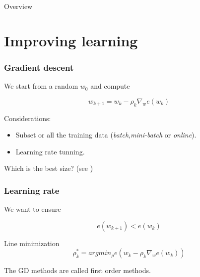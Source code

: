 


\begin{frame}{Overview}
  \tableofcontents
\end{frame}
\section{Improving learning}

\begin{frame}
  \frametitle{Gradient descent}

  We start from a random $w_0$ and compute 

  \begin{equation}
    w_{k +1} 
    = 
    w_{k} - \rho_k \nabla_w e(w_k)
  \end{equation}
  
  Considerations: 
  \begin{itemize}
    \item Subset or all the training data (\textit{batch},\textit{mini-batch} or \textit{online}). 
    \item Learning rate tunning. 
  \end{itemize}

  Which is the best size? (see \cite{SmallBatchSize})
\end{frame}

\begin{frame}
  \frametitle{Learning rate}
  We want to ensure

  \begin{equation}
    e(w_{k+1}) < e(w_k)
  \end{equation}

  Line minimization
  \begin{equation}
    \rho_k^* 
    =
    arg min_\rho e(w_{k} - \rho_k \nabla_w e(w_k))
  \end{equation}
  
  The GD methods are called first order methods. 
\end{frame}

